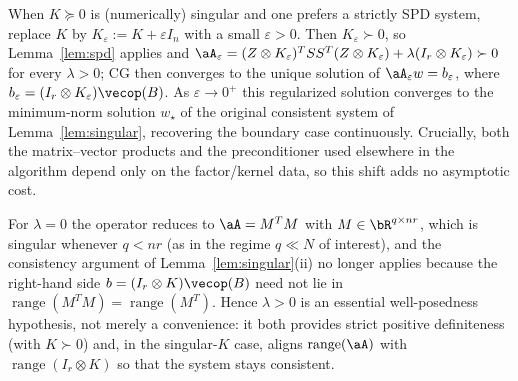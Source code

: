 \begin{remark}\label{rem:reg}
When $K\succeq0$ is (numerically) singular and one prefers a strictly SPD
system, replace $K$ by $K_\varepsilon:=K+\varepsilon I_n$ with a small
$\varepsilon>0$. Then $K_\varepsilon\succ0$, so Lemma~\ref{lem:spd} applies and
$\aA_\varepsilon=(Z\otimes K_\varepsilon)^{T}SS^{T}(Z\otimes K_\varepsilon)
+\lambda(I_r\otimes K_\varepsilon)\succ0$ for every $\lambda>0$; CG then
converges to the unique solution of $\aA_\varepsilon w=b_\varepsilon$, where
$b_\varepsilon=(I_r\otimes K_\varepsilon)\vecop(B)$. As $\varepsilon\to0^{+}$
this regularized solution converges to the minimum-norm solution
$w_\star$ of the original consistent system of Lemma~\ref{lem:singular},
recovering the boundary case continuously. Crucially, both the matrix--vector
products and the preconditioner used elsewhere in the algorithm depend only on
the factor/kernel data, so this shift adds no asymptotic cost.
\end{remark}

\begin{remark}\label{rem:lam0}
For $\lambda=0$ the operator reduces to $\aA=M^{T}M$ with $M\in\bR^{q\times nr}$,
which is singular whenever $q<nr$ (as in the regime $q\ll N$ of interest), and
the consistency argument of Lemma~\ref{lem:singular}(ii) no longer applies
because the right-hand side $b=(I_r\otimes K)\vecop(B)$ need not lie in
$\operatorname{range}(M^{T}M)=\operatorname{range}(M^{T})$. Hence $\lambda>0$ is
an essential well-posedness hypothesis, not merely a convenience: it both
provides strict positive definiteness (with $K\succ0$) and, in the singular-$K$
case, aligns $\operatorname{range}(\aA)$ with $\operatorname{range}(I_r\otimes K)$
so that the system stays consistent.
\end{remark}


